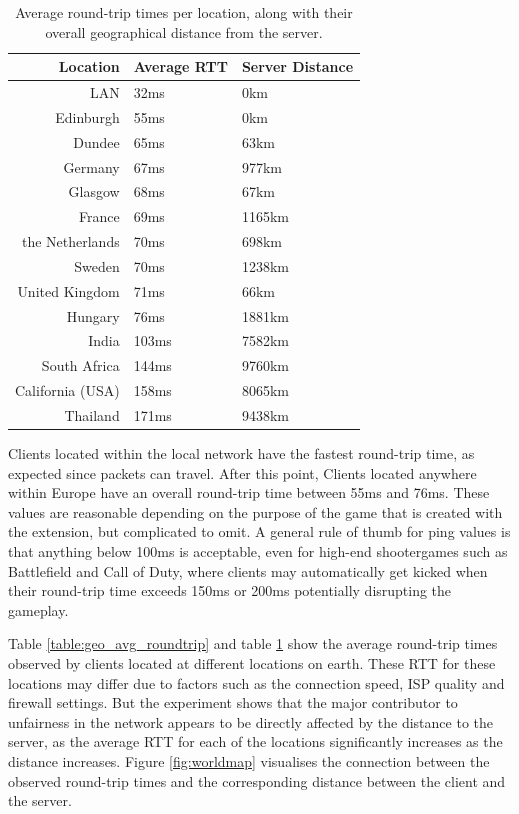 \documentclass[bsc, 12pt, twoside, singlespacing, parskip, abbrevs, notimes, normalheadings, logo]{styles/infthesis}
\begin{document}
\begin{table}[H]
\centering
  \begin{tabular}{ r | l | l }
Location		& Average RTT	& Server Distance \\ \hline\hline
LAN				& 32ms			&0km\\
Edinburgh		& 55ms			&0km\\
Dundee			& 65ms			&63km\\
Germany			& 67ms			&977km\\
Glasgow			& 68ms			&67km\\
France			& 69ms			&1165km\\
the Netherlands	& 70ms			&698km\\
Sweden			& 70ms			&1238km\\
United Kingdom	& 71ms			&66km\\
Hungary			& 76ms			&1881km\\
India			& 103ms			&7582km\\
South Africa	& 144ms			&9760km\\
California (USA)& 158ms			&8065km\\
Thailand		& 171ms			&9438km\\
  \end{tabular}
  \caption{Average round-trip times per location, along with their overall geographical distance from the server.}
  \label{table:geo_avg_location}
\end{table}

Clients located within the local network have the fastest round-trip time, as expected since packets can travel. After this point, Clients located anywhere within Europe have an overall round-trip time between 55ms and 76ms. These values are reasonable depending on the purpose of the game that is created with the extension, but complicated to omit. A general rule of thumb for ping values is that anything below 100ms is acceptable, even for high-end shootergames such as Battlefield and Call of Duty, where clients may automatically get kicked when their round-trip time exceeds 150ms or 200ms potentially disrupting the gameplay.

Table \ref{table:geo_avg_roundtrip} and table \ref{table:geo_avg_location} show the average round-trip times observed by clients located at different locations on earth. These RTT for these locations may differ due to factors such as the connection speed, ISP quality and firewall settings. But the experiment shows that the major contributor to unfairness in the network appears to be directly affected by the distance to the server, as the average RTT for each of the locations significantly increases as the distance increases. Figure \ref{fig:worldmap} visualises the connection between the observed round-trip times and the corresponding distance between the client and the server. 
\end{document}
